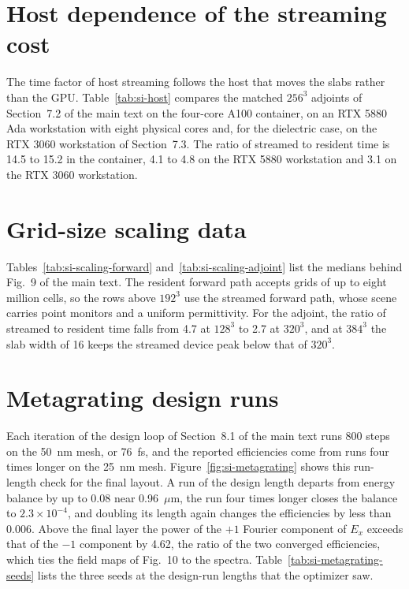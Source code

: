 \documentclass[11pt,a4paper]{article}
\newcommand{\micron}{\ensuremath{\mu\mathrm{m}}}
\begin{document}
\section{Host dependence of the streaming cost}
\label{si:host}

The time factor of host streaming follows the host that moves the slabs rather than the GPU. Table~\ref{tab:si-host} compares the matched $256^3$ adjoints of Section~7.2 of the main text on the four-core A100 container, on an RTX 5880 Ada workstation with eight physical cores and, for the dielectric case, on the RTX 3060 workstation of Section~7.3. The ratio of streamed to resident time is 14.5 to 15.2 in the container, 4.1 to 4.8 on the RTX 5880 workstation and 3.1 on the RTX 3060 workstation.



\section{Grid-size scaling data}
\label{si:scaling}

Tables~\ref{tab:si-scaling-forward} and~\ref{tab:si-scaling-adjoint} list the medians behind Fig.~9 of the main text. The resident forward path accepts grids of up to eight million cells, so the rows above $192^3$ use the streamed forward path, whose scene carries point monitors and a uniform permittivity. For the adjoint, the ratio of streamed to resident time falls from 4.7 at $128^3$ to 2.7 at $320^3$, and at $384^3$ the slab width of 16 keeps the streamed device peak below that of $320^3$.




\section{Metagrating design runs}
\label{si:metagrating}

Each iteration of the design loop of Section~8.1 of the main text runs 800 steps on the 50~nm mesh, or 76~fs, and the reported efficiencies come from runs four times longer on the 25~nm mesh. Figure~\ref{fig:si-metagrating} shows this run-length check for the final layout. A run of the design length departs from energy balance by up to 0.08 near 0.96~\micron{}, the run four times longer closes the balance to $2.3\times10^{-4}$, and doubling its length again changes the efficiencies by less than 0.006. Above the final layer the power of the $+1$ Fourier component of $E_x$ exceeds that of the $-1$ component by 4.62, the ratio of the two converged efficiencies, which ties the field maps of Fig.~10 to the spectra. Table~\ref{tab:si-metagrating-seeds} lists the three seeds at the design-run lengths that the optimizer saw.
\end{document}
